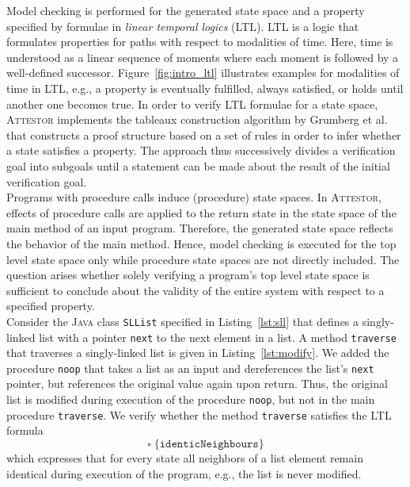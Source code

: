 \documentclass[a4paper, 12pt, twoside]{report}
\begin{document}
	
	Model checking is performed for the generated state space and a property specified by formulae in \textit{linear temporal logics} (LTL). LTL is a logic that formulates properties for paths with respect to modalities of time. Here, time is understood as a linear sequence of moments where each moment is followed by a well-defined successor. Figure~\ref{fig:intro_ltl} illustrates examples for modalities of time in LTL, e.g., a property is eventually fulfilled, always satisfied, or holds until another one becomes true. In order to verify LTL formulae for a state space, \textsc{Attestor} implements the tableaux construction algorithm by Grumberg et al. \cite{bhat1995efficient} that constructs a proof structure based on a set of rules in order to infer whether a state satisfies a property. The approach thus successively divides a verification goal into subgoals until a statement can be made about the result of the initial verification goal.\\	
	
	Programs with procedure calls induce (procedure) state spaces. In \textsc{Attestor}, effects of procedure calls are applied to the return state in the state space of the main method of an input program. Therefore, the generated state space reflects the behavior of the main method. Hence, model checking is executed for the top level state space only while procedure state spaces are not directly included. The question arises whether solely verifying a program's top level state space is sufficient to conclude about the validity of the entire system with respect to a specified property.\\ 	
	
	Consider the \textsc{Java} class \texttt{SLList} specified in Listing~\ref{lst:sll} that defines a singly-linked list with a pointer \texttt{next} to the next element in a list. A method \texttt{traverse} that traverses a singly-linked list is given in Listing~\ref{lst:modify}. We added the procedure \texttt{noop} that takes a list as an input and dereferences the list's \texttt{next} pointer, but references the original value again upon return. Thus, the original list is modified during execution of the procedure \texttt{noop}, but not in the main procedure \texttt{traverse}. We verify whether the method \texttt{traverse} satisfies the LTL formula \[\square\;\{\texttt{identicNeighbours}\}\] which expresses that for every state all neighbors of a list element remain identical during execution of the program, e.g., the list is never modified.\\
	
\end{document}
